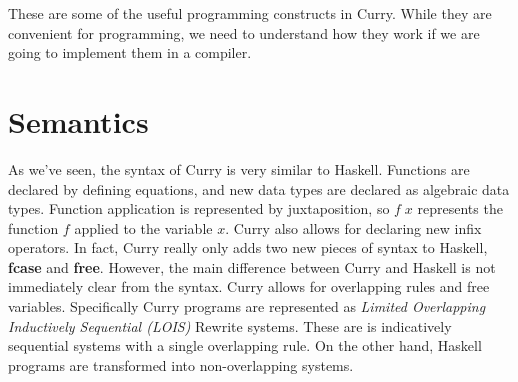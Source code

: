 \documentclass{book}
\theoremstyle{definition}
\newcommand{\Varid}[1]{\mathit{#1}}
\begin{document}
These are some of the useful programming constructs in Curry.
While they are convenient for programming, we need to understand how they work
if we are going to implement them in a compiler.

\section{Semantics} \label{Semantics}

As we've seen, the syntax of Curry is very similar to Haskell.
Functions are declared by defining equations, and new data types are declared as algebraic data types.
Function application is represented by juxtaposition,
so \ensuremath{\Varid{f}\;\Varid{x}} represents the function \ensuremath{\Varid{f}} applied to the variable \ensuremath{\Varid{x}}.
Curry also allows for declaring new infix operators.
In fact, Curry really only adds two new pieces of syntax to Haskell, \textbf{fcase} and \textbf{free}.
However, the main difference between Curry and Haskell is not immediately clear from the syntax.
Curry allows for overlapping rules and free variables.
Specifically Curry programs are represented as 
\emph{Limited Overlapping Inductively Sequential (LOIS)}
 Rewrite systems.
These are is indicatively sequential systems with a single overlapping rule.
On the other hand, Haskell programs are transformed into non-overlapping systems.
\end{document}
